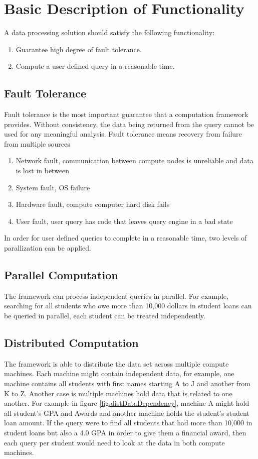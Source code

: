 \documentclass[10pt,twocolumn]{IEEEtran11}
\begin{document}
\section{Basic Description of Functionality}

A data processing solution should satisfy the following functionality:
\begin{enumerate}	
	\item Guarantee high degree of fault tolerance.
	\item Compute a user defined query in a reasonable time.
\end{enumerate}

\subsection{Fault Tolerance}
Fault tolerance is the most important guarantee that a computation framework provides.  Without consistency, the data being returned from the query cannot be used for any meaningful analysis. Fault tolerance means recovery from failure from multiple sources

\begin{enumerate}
	\item Network fault, communication between compute nodes is unreliable and data is lost in between
	\item System fault, OS failure
	\item Hardware fault, compute computer hard disk fails
	\item User fault, user query has code that leaves query engine in a bad state
\end{enumerate}

In order for user defined queries to complete in a reasonable time, two levels of parallization can be applied.

\subsection{Parallel Computation}
The framework can process independent queries in parallel.  For example, searching for all students who owe more than 10,000 dollars in student loans
can be queried in parallel, each student can be treated independently.

\subsection{Distributed Computation}
The framework is able to distribute the data set across multiple compute machines.  Each machine might contain independent data, for example, one machine contains all students with first names starting A to J and another from K to Z.  Another case is multiple machines hold data that is related to one another.  For example in figure  \ref{fig:distDataDependency}, machine A might hold all student's GPA and Awards and another machine holds the student's student loan amount.
If the query were to find all students that had more than 10,000 in student loans but also a 4.0 GPA in order to give them a financial award, then each query per student would need to look at the data in both compute machines.
\end{document}
